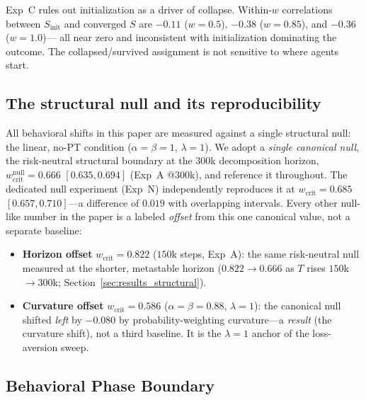 \documentclass[letterpaper]{article}
\theoremstyle{plain}
\newcommand{\wcrit}{w_{\mathrm{crit}}}
\begin{document}
Exp~C rules out initialization as a driver of collapse.
Within-$w$ correlations between $S_{\mathrm{init}}$ and converged $S$
are $-0.11$ ($w{=}0.5$), $-0.38$ ($w{=}0.85$), and $-0.36$ ($w{=}1.0$)---
all near zero and inconsistent with initialization dominating the outcome.
The collapsed/survived assignment is not sensitive to where agents start.

\subsection{The structural null and its reproducibility}
\label{sec:results_null}

All behavioral shifts in this paper are measured against a single structural
null: the linear, no-PT condition ($\alpha{=}\beta{=}1$, $\lambda{=}1$). We
adopt a \emph{single canonical null}, the risk-neutral structural boundary at
the $300$k decomposition horizon, $\wcrit^{\text{null}} = 0.666$ $[0.635, 0.694]$
(Exp~A @300k), and reference it throughout. The dedicated null experiment
(Exp~N) independently reproduces it at $\wcrit = 0.685$ $[0.657, 0.710]$---a
difference of $0.019$ with overlapping intervals. Every other null-like number
in the paper is a labeled \emph{offset} from this one canonical value, not a
separate baseline:
\begin{itemize}\itemsep0pt
  \item \textbf{Horizon offset} $\wcrit = 0.822$ ($150$k steps, Exp~A): the same
  risk-neutral null measured at the shorter, metastable horizon
  ($0.822\!\to\!0.666$ as $T$ rises $150$k$\to$$300$k;
  Section~\ref{sec:results_structural}).
  \item \textbf{Curvature offset} $\wcrit = 0.586$ ($\alpha{=}\beta{=}0.88$,
  $\lambda{=}1$): the canonical null shifted \emph{left} by $-0.080$ by
  probability-weighting curvature---a \emph{result} (the curvature shift), not a
  third baseline. It is the $\lambda{=}1$ anchor of the loss-aversion sweep.
\end{itemize}

\subsection{Behavioral Phase Boundary}
\label{sec:results_behavioral}
\end{document}
